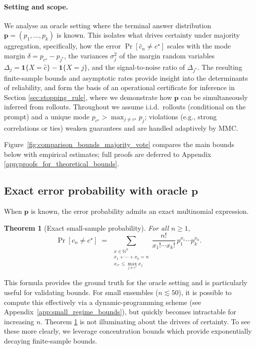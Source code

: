\documentclass{article} %
\newtheorem{theorem}{Theorem}[section]
\begin{document}
\paragraph{Setting and scope.}
We analyse an oracle setting where the terminal answer distribution $\mathbf p=(p_1,\dots,p_k)$ is {known}. 
This isolates what drives certainty under majority aggregation, specifically, how the error $\Pr[\widehat{c}_n\neq c^\star]$ scales with the mode margin $\delta=p_{c^\star}-p_{j^\star}$, the variances $\sigma_j^2$ of the margin random variables $\Delta_j ={ \mathbf 1\{X=\hat c\}-\mathbf 1\{X=j\}}$, and the signal-to-noise ratio of $\Delta_{j^\star}$. 
The resulting finite-sample bounds and asymptotic rates provide {insight} into the determinants of reliability, and form the basis of an operational certificate for inference in Section \ref{sec:stopping_rule}, where we demonstrate how $\mathbf{p}$ can be simultaneously inferred from rollouts.  Throughout we assume i.i.d.\ rollouts (conditional on the prompt) and a unique mode $p_{c^\star}>\max_{j\neq c^\star}p_j$; violations (e.g., strong correlations or ties) weaken guarantees and are handled adaptively by MMC.

Figure~\ref{fig:comparison_bounds_majority_vote} compares the main bounds below with empirical estimates; full proofs are deferred to Appendix \ref{app:proofs_for_theoretical_bounds}.

\subsection{Exact error probability with oracle $\mathbf p$}
\label{subsec:small_sample}

When $\mathbf p$ is known, the error probability admits an exact multinomial expression.

\begin{theorem}[Exact small-sample probability]\label{thm:bounds_small_regime}
For all $n\ge 1$,
\[
\Pr[\widehat{c}_n\neq c^\star]
\;=\;
\sum_{\substack{x\in\mathbb N^k\\ x_1+\cdots+x_k=n\\ x_{c^\star}\le \max_{j\neq c^\star}x_j}}
\frac{n!}{x_1!\cdots x_k!}\,p_1^{x_1}\cdots p_k^{x_k}.
\]
\end{theorem}

This formula provides the ground truth for the oracle setting and is particularly useful for validating bounds.   For small ensembles ($n\lesssim 50$), it is possible to compute this effectively via a dynamic-programming scheme (see Appendix~\ref{app:small_regime_bounds}), but quickly becomes intractable for increasing $n$.    Theorem \ref{thm:bounds_small_regime} is not illuminating about the {drivers} of certainty.   To see these more clearly, we leverage concentration bounds which provide exponentially decaying finite-sample bounds.
\end{document}

